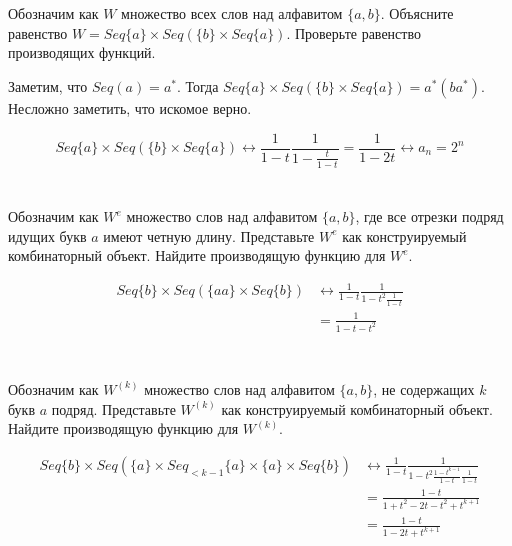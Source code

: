 



\setcounter{section}{66}

\section{}
Обозначим как $W$ множество всех слов над алфавитом $\{a, b\}$. Объясните равенство $W=Seq\{a\}\times Seq(\{b\}\times Seq\{a\})$. Проверьте равенство производящих функций.

Заметим, что \(Seq(a) = a^*\). Тогда \(Seq\{a\}\times Seq(\{b\}\times Seq\{a\}) = a^* (ba^*)\). Несложно заметить, что искомое верно.

\[
    Seq\{a\}\times Seq(\{b\}\times Seq\{a\}) \leftrightarrow \frac{1}{1 - t} \frac{1}{1 - \frac{t}{1 - t}} = \frac{1}{1 - 2t} \leftrightarrow a_n = 2^n
\]

\section{}
Обозначим как $W^{e}$ множество слов над алфавитом $\{a, b\}$, где все отрезки подряд идущих букв $a$ имеют четную длину. Представьте $W^{e}$ как конструируемый комбинаторный объект. Найдите производящую функцию для $W^{e}$.

\begin{align*}
    Seq \{b\} \times Seq(\{aa\} \times Seq \{b\}) & \leftrightarrow \frac{1}{1 - t}\frac{1}{1 - t^2 \frac{1}{1 - t}} \\
                                                  & = \frac{1}{1 - t - t^2}                                          \\
\end{align*}

\section{}
Обозначим как $W^{(k)}$ множество слов над алфавитом $\{a, b\}$, не содержащих $k$ букв $a$ подряд. Представьте $W^{(k)}$ как конструируемый комбинаторный объект. Найдите производящую функцию для $W^{(k)}$.

\begin{align*}
    Seq \{b\} \times Seq(\{a\} \times Seq_{ < k - 1} \{a\} \times \{a\} \times Seq \{b\} ) & \leftrightarrow \frac{1}{1 - t} \frac{1}{1 - t^2 \frac{1 - t^{k - 1}}{1 - t} \frac{1}{1 - t}} \\
                                                                                           & = \frac{1 - t}{1 + t^2 - 2t - t^2 + t^{k + 1}}                                                \\
                                                                                           & = \frac{1 - t}{1 - 2t + t^{k + 1}}
\end{align*}

